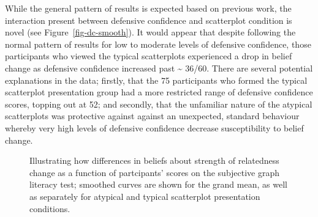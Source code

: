 \documentclass[manuscript,screen,review]{acmart}
\begin{document}
While the general pattern of results is expected based on previous work,
the interaction present between defensive confidence and scatterplot
condition is novel (see Figure~\ref{fig-dc-smooth}). It would appear
that despite following the normal pattern of results for low to moderate
levels of defensive confidence, those participants who viewed the
typical scatterplots experienced a drop in belief change as defensive
confidence increased past \textasciitilde{} 36/60. There are several
potential explanations in the data; firstly, that the 75 participants
who formed the typical scatterplot presentation group had a more
restricted range of defensive confidence scores, topping out at 52; and
secondly, that the unfamiliar nature of the atypical scatterplots was
protective against against an unexpected, standard behaviour whereby
very high levels of defensive confidence decrease susceptibility to
belief change.

\begin{figure}


\caption{\label{fig-emo-smooth}Illustrating how differences in beliefs
about strength of relatedness change as a function of partcipants'
scores on the subjective graph literacy test; smoothed curves are shown
for the grand mean, as well as separately for atypical and typical
scatterplot presentation conditions.}

\end{figure}%
\end{document}
